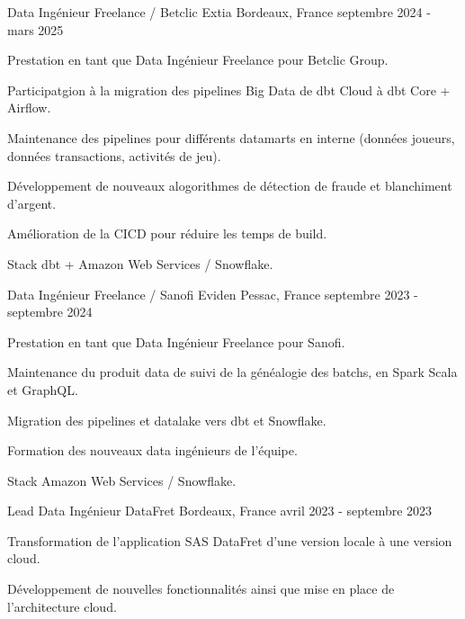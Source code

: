 
\begin{cventries}
	\cventry
	{Data Ingénieur Freelance / Betclic}
	{Extia}
	{Bordeaux, France}
	{septembre 2024 - mars 2025}
	{
		\begin{cvitems}
			\item {Prestation en tant que Data Ingénieur Freelance pour Betclic Group.}
			\item {Participatgion à la migration des pipelines Big Data de dbt Cloud à dbt Core + Airflow.}
			\item {Maintenance des pipelines pour différents datamarts en interne (données joueurs, données transactions, activités de jeu).}
			\item {Développement de nouveaux alogorithmes de détection de fraude et blanchiment d'argent.}
			\item {Amélioration de la CICD pour réduire les temps de build.}
			\item {Stack dbt + Amazon Web Services / Snowflake.}
		\end{cvitems}
	}

	\cventry
	{Data Ingénieur Freelance / Sanofi}
	{Eviden}
	{Pessac, France}
	{septembre 2023 - septembre 2024}
	{
		\begin{cvitems}
			\item {Prestation en tant que Data Ingénieur Freelance pour Sanofi.}
			\item {Maintenance du produit data de suivi de la généalogie des batchs, en Spark Scala et GraphQL.}
			\item {Migration des pipelines et datalake vers dbt et Snowflake.}
			\item {Formation des nouveaux data ingénieurs de l’équipe.}
			\item {Stack Amazon Web Services / Snowflake.}
		\end{cvitems}
	}
	
	\cventry
	{Lead Data Ingénieur}
	{DataFret}
	{Bordeaux, France}
	{avril 2023 - septembre 2023}
	{
		\begin{cvitems}
			\item {Transformation de l'application SAS DataFret d'une version locale à une version cloud.}
			\item {Développement de nouvelles fonctionnalités ainsi que mise en place de l'architecture cloud.}
		\end{cvitems}
	}
	

\end{cventries}
